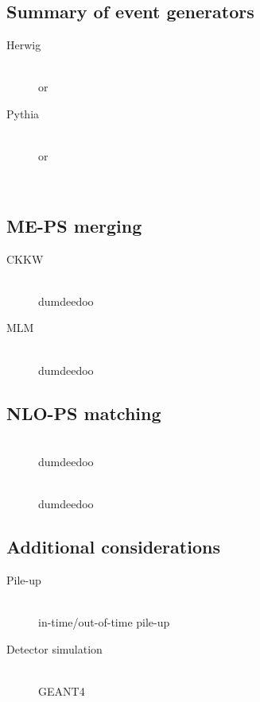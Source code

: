 \subsection{Summary of event generators}
\begin{description}
\item[Herwig] \hfill \\
	\fherwig or \herwigpp \cpp
\item[Pythia] \hfill \\
	 or 
\item[\sherpa] \hfill \\
	\sherpa
\end{description}

\subsection{ME-PS merging}
\begin{description}
\item[CKKW] \hfill \\
	dumdeedoo
\item[MLM] \hfill \\
	dumdeedoo
\end{description}

\subsection{NLO-PS matching}
\begin{description}
\item[\mcatnlo] \hfill \\
	dumdeedoo
\item[\powheg] \hfill \\
	dumdeedoo
\end{description}

\subsection{Additional considerations}
\begin{description}
\item[Pile-up] \hfill \\
	in-time/out-of-time pile-up
\item[Detector simulation] \hfill \\
	GEANT4
\end{description}